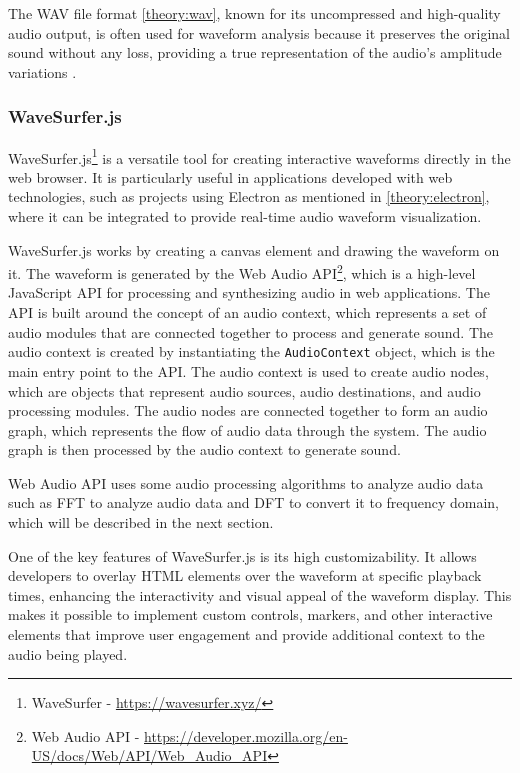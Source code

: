 The WAV file format \ref{theory:wav}, known for its uncompressed and high-quality audio output, is often used for waveform analysis because it preserves the original sound without any loss, providing a true representation of the audio's amplitude variations \cite{WikiAudioFormat}.

\subsubsection{WaveSurfer.js}
\label{theory:wavesurfer}
WaveSurfer.js\footnote{WaveSurfer - \url{https://wavesurfer.xyz/}} is a versatile tool for creating interactive waveforms directly in the web browser. It is particularly useful in applications developed with web technologies, such as projects using Electron as mentioned in \ref{theory:electron}, where it can be integrated to provide real-time audio waveform visualization.

WaveSurfer.js works by creating a canvas element and drawing the waveform on it. The waveform is generated by the Web Audio API\footnote{Web Audio API - \url{https://developer.mozilla.org/en-US/docs/Web/API/Web_Audio_API}}, which is a high-level JavaScript API for processing and synthesizing audio in web applications. The API is built around the concept of an audio context, which represents a set of audio modules that are connected together to process and generate sound. The audio context is created by instantiating the \texttt{AudioContext} object, which is the main entry point to the API. The audio context is used to create audio nodes, which are objects that represent audio sources, audio destinations, and audio processing modules. The audio nodes are connected together to form an audio graph, which represents the flow of audio data through the system. The audio graph is then processed by the audio context to generate sound.

Web Audio API uses some audio processing algorithms to analyze audio data such as FFT to analyze audio data and DFT to convert it to frequency domain, which will be described in the next section.

One of the key features of WaveSurfer.js is its high customizability. It allows developers to overlay HTML elements over the waveform at specific playback times, enhancing the interactivity and visual appeal of the waveform display. This makes it possible to implement custom controls, markers, and other interactive elements that improve user engagement and provide additional context to the audio being played.

